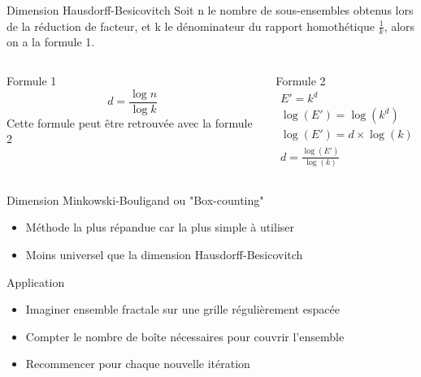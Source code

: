 \documentclass{beamer}
\begin{document}
\begin{frame}{Dimension Hausdorff-Besicovitch}
Soit n le nombre de sous-ensembles obtenus lors de la réduction de facteur, et k le dénominateur du rapport homothétique $\frac{1}{k}$, alors on a la formule 1.
\begin{columns}[t]
  \begin{column}{5cm}
  \begin{block}{Formule 1}
    \begin{equation}
    d = \frac{\log n}{\log k}\label{eq:solution}
\end{equation}
Cette formule peut être retrouvée avec la formule 2
  \end{block} 
  \end{column}
  
  \begin{column}{5cm}
  \begin{block}{Formule 2}
   \begin{align*}
  E' = k^d \\
  \log(E') = \log(k^d)\\
  \log(E') = d \times \log(k) \\
  d = \frac{\log(E')}{\log(k)}
\end{align*}
  \end{block}   
  \end{column}
 \end{columns}  
\end{frame}

\begin{frame}{Dimension Minkowski-Bouligand ou "Box-counting"}
\begin{block}{}
        \begin{itemize}
        \item Méthode la plus répandue car la plus simple à utiliser
        \item Moins universel que la dimension Hausdorff-Besicovitch
    \end{itemize}
\end{block}
\begin{block}{Application}
    \begin{itemize}
        \item Imaginer ensemble fractale sur une grille régulièrement espacée
        \item Compter le nombre de boîte nécessaires pour couvrir l'ensemble
        \item Recommencer pour chaque nouvelle itération
    \end{itemize}
\end{block}
\end{frame}
\end{document}
